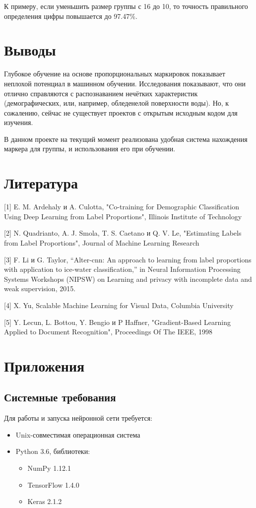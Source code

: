 \documentclass[12pt,a4paper]{article}
\begin{document}
К примеру, если уменьшить размер группы с 16 до 10, то точность
правильного определения цифры повышается до 97.47\%.

\section{Выводы}

Глубокое обучение на основе пропорциональных маркировок показывает
неплохой потенциал в машинном обучении. Исследования показывают, что
они отлично справляются с распознаванием нечётких характеристик
(демографических, или, например, обледенелой поверхности воды).
Но, к сожалению, сейчас не существует проектов с открытым исходным
кодом для изучения.

В данном проекте на текущий момент реализована удобная система
нахождения маркера для группы, и использования его при обучении.

\section{Литература}

[1] E. M. Ardehaly и A. Culotta, "Co-training for Demographic
Classification Using Deep Learning from Label Proportions", Illinois
Institute of Technology

[2] N. Quadrianto, A. J. Smola, T. S. Caetano и Q. V. Le, "Estimating
Labels from Label Proportions", Journal of Machine Learning Research

[3] F. Li и G. Taylor, “Alter-cnn: An approach to learning from label
proportions with application to ice-water classification,” in Neural
Information Processing Systems Workshops (NIPSW) on Learning and
privacy with incomplete data and weak supervision, 2015.

[4] X. Yu, Scalable Machine Learning for Visual Data, Columbia
University

[5] Y. Lecun, L. Bottou, Y. Bengio и P Haffner, "Gradient-Based
Learning Applied to Document Recognition", Proceedings Of The IEEE,
1998
\section{Приложения}

\subsection{Системные требования}

Для работы и запуска нейронной сети требуется:
\begin{itemize}
\item Unix-совместимая операционная система
\item Python 3.6, библиотеки:
  \begin{itemize}
  \item NumPy 1.12.1
  \item TensorFlow 1.4.0
  \item Keras 2.1.2
  \end{itemize}
\end{itemize}
\end{document}

